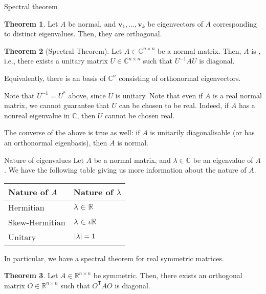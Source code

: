 \documentclass[dvipsnames]{beamer}
\theoremstyle{definition}
\newtheorem{thm}{Theorem}
\begin{document}
\begin{frame}{Spectral theorem}
    \begin{thm}
        Let $A$ be normal, and $\mathbf{v}_{1}, \ldots, \mathbf{v}_{k}$ be eigenvectors of $A$ corresponding to distinct eigenvalues. \pause Then, they are orthogonal.
    \end{thm} \pause

    \begin{thm}[Spectral Theorem]
        Let $A \in \mathbb{C}^{n \times n}$ be a normal matrix. Then, $A$ is , \pause i.e., there exists a unitary matrix $U \in \mathbb{C}^{n \times n}$ such that $U^{-1} A U$ is diagonal. \pause

        Equivalently, there is an basis of $\mathbb{C}^{n}$ consisting of orthonormal eigenvectors.
    \end{thm} \pause

    Note that $U^{-1} = U^{\ast}$ above, since $U$ is unitary. \pause Note that even if $A$ is a real normal matrix, we cannot guarantee that $U$ can be chosen to be real. \pause Indeed, if $A$ has a nonreal eigenvalue in $\mathbb{C}$, then $U$ cannot be chosen real. \pause

    The converse of the above is true as well: if $A$ is unitarily diagonalisable (or has an orthonormal eigenbasis), then $A$ is normal.
\end{frame}
\begin{frame}{Nature of eigenvalues}
    Let $A$ be a normal matrix, and $\lambda \in \mathbb{C}$ be an eigenvalue of $A$. \pause We have the following table giving us more information about the nature of $A$.

    \begin{center}
        \begin{tabular}{|l|l|}
            \hline
            Nature of $A$ & Nature of $\lambda$ \\
            \hline
            Hermitian & $\lambda \in \mathbb{R}$ \\ 
            Skew-Hermitian & $\lambda \in \iota \mathbb{R}$ \\
            Unitary & ${\left\lvert \lambda \right\lvert} = 1$ \\
            \hline
        \end{tabular}
    \end{center} \pause

    In particular, we have a spectral theorem for real symmetric matrices. \pause

    \begin{thm}
        Let $A \in \mathbb{R}^{n \times n}$ be symmetric. Then, there exists an orthogonal matrix $O \in \mathbb{R}^{n \times n}$ such that $O^{\mathsf{T}} A O$ is diagonal.
    \end{thm}
\end{frame}
\end{document}
